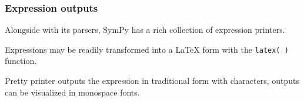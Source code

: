 \subsubsection{Expression outputs}

Alongside with its parsers, SymPy has a rich collection of expression printers.

Expressions may be readily transformed into a LaTeX form with the \texttt{latex( )}
function.

Pretty printer outputs the expression in traditional form with characters,
outputs can be visualized in monospace fonts.

